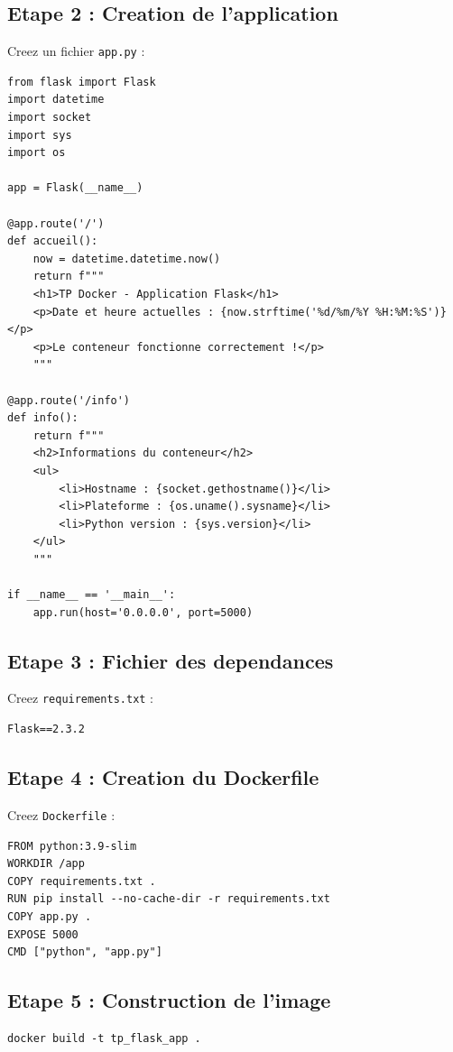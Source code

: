 \documentclass[a4paper,12pt]{article}
\begin{document}
\subsection{Etape 2 : Creation de l'application}
Creez un fichier \texttt{app.py} :
\begin{lstlisting}[style=pythonstyle, caption=Application a creer]
from flask import Flask
import datetime
import socket
import sys
import os

app = Flask(__name__)

@app.route('/')
def accueil():
    now = datetime.datetime.now()
    return f"""
    <h1>TP Docker - Application Flask</h1>
    <p>Date et heure actuelles : {now.strftime('%d/%m/%Y %H:%M:%S')}</p>
    <p>Le conteneur fonctionne correctement !</p>
    """

@app.route('/info')
def info():
    return f"""
    <h2>Informations du conteneur</h2>
    <ul>
        <li>Hostname : {socket.gethostname()}</li>
        <li>Plateforme : {os.uname().sysname}</li>
        <li>Python version : {sys.version}</li>
    </ul>
    """

if __name__ == '__main__':
    app.run(host='0.0.0.0', port=5000)
\end{lstlisting}

\subsection{Etape 3 : Fichier des dependances}
Creez \texttt{requirements.txt} :
\begin{lstlisting}
Flask==2.3.2
\end{lstlisting}

\subsection{Etape 4 : Creation du Dockerfile}
Creez \texttt{Dockerfile} :
\begin{lstlisting}
FROM python:3.9-slim
WORKDIR /app
COPY requirements.txt .
RUN pip install --no-cache-dir -r requirements.txt
COPY app.py .
EXPOSE 5000
CMD ["python", "app.py"]
\end{lstlisting}

\subsection{Etape 5 : Construction de l'image}
\begin{lstlisting}
docker build -t tp_flask_app .
\end{lstlisting}
\end{document}
